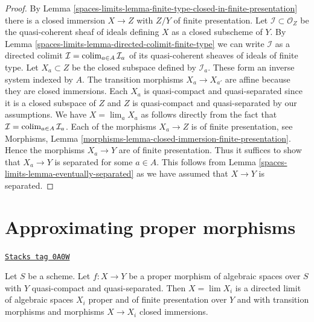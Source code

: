 \begin{proof}
By Lemma \ref{spaces-limits-lemma-finite-type-closed-in-finite-presentation}
there is a closed immersion $X \to Z$ with $Z/Y$ of
finite presentation. Let $\mathcal{I} \subset \mathcal{O}_Z$
be the quasi-coherent sheaf of ideals defining $X$ as a closed
subscheme of $Y$. By
Lemma \ref{spaces-limits-lemma-directed-colimit-finite-type}
we can write $\mathcal{I}$ as a directed colimit
$\mathcal{I} = \operatorname{colim}_{a \in A} \mathcal{I}_a$ of its
quasi-coherent sheaves of ideals of finite type.
Let $X_a \subset Z$ be the closed subspace defined by $\mathcal{I}_a$.
These form an inverse system indexed by $A$.
The transition morphisms $X_a \to X_{a'}$ are affine because
they are closed immersions. Each $X_a$ is quasi-compact and quasi-separated
since it is a closed subspace of $Z$ and $Z$ is quasi-compact and
quasi-separated by our assumptions.
We have $X = \lim_a X_a$ as follows directly from the
fact that $\mathcal{I} = \operatorname{colim}_{a \in A} \mathcal{I}_a$.
Each of the morphisms $X_a \to Z$ is of finite presentation, see
Morphisms, Lemma \ref{morphisms-lemma-closed-immersion-finite-presentation}.
Hence the morphisms $X_a \to Y$ are of finite presentation.
Thus it suffices to show that $X_a \to Y$ is separated for some
$a \in A$. This follows from Lemma \ref{spaces-limits-lemma-eventually-separated}
as we have assumed that $X \to Y$ is separated.
\end{proof}

\section{Approximating proper morphisms}
\label{spaces-limits-section-approximate-proper}
\begin{lemma}
\label{spaces-limits-lemma-proper-limit-of-proper-finite-presentation}
\href{https://stacks.math.columbia.edu/tag/0A0W}{\texttt{Stacks tag 0A0W}}

Let $S$ be a scheme. Let $f : X \to Y$ be a proper morphism of algebraic
spaces over $S$ with $Y$ quasi-compact and quasi-separated. Then
$X = \lim X_i$ is a directed limit of algebraic spaces $X_i$
proper and of finite presentation over $Y$ and with transition
morphisms and morphisms $X \to X_i$ closed immersions.
\end{lemma}

